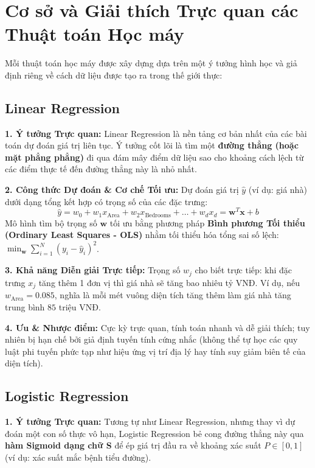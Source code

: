 \documentclass[12pt,a4paper]{report}
\begin{document}
\section{Cơ sở và Giải thích Trực quan các Thuật toán Học máy}

Mỗi thuật toán học máy được xây dựng dựa trên một ý tưởng hình học và giả định riêng về cách dữ liệu được tạo ra trong thế giới thực:

\subsection{Linear Regression}
\textbf{1. Ý tưởng Trực quan:} Linear Regression là nền tảng cơ bản nhất của các bài toán dự đoán giá trị liên tục. Ý tưởng cốt lõi là tìm một \textbf{đường thẳng (hoặc mặt phẳng phẳng)} đi qua đám mây điểm dữ liệu sao cho khoảng cách lệch từ các điểm thực tế đến đường thẳng này là nhỏ nhất.

\textbf{2. Công thức Dự đoán \& Cơ chế Tối ưu:}
Dự đoán giá trị $\hat{y}$ (ví dụ: giá nhà) dưới dạng tổng kết hợp có trọng số của các đặc trưng:
\begin{equation}
\hat{y} = w_0 + w_1 x_{\text{Area}} + w_2 x_{\text{Bedrooms}} + \dots + w_d x_d = \mathbf{w}^T \mathbf{x} + b
\end{equation}
Mô hình tìm bộ trọng số $\mathbf{w}$ tối ưu bằng phương pháp \textbf{Bình phương Tối thiểu (Ordinary Least Squares - OLS)} nhằm tối thiểu hóa tổng sai số lệch: $\min_{\mathbf{w}} \sum_{i=1}^N (y_i - \hat{y}_i)^2$.

\textbf{3. Khả năng Diễn giải Trực tiếp:} Trọng số $w_j$ cho biết trực tiếp: khi đặc trưng $x_j$ tăng thêm 1 đơn vị thì giá nhà sẽ tăng bao nhiêu tỷ VNĐ. Ví dụ, nếu $w_{\text{Area}} = 0.085$, nghĩa là mỗi mét vuông diện tích tăng thêm làm giá nhà tăng trung bình $85$ triệu VNĐ.

\textbf{4. Ưu \& Nhược điểm:} Cực kỳ trực quan, tính toán nhanh và dễ giải thích; tuy nhiên bị hạn chế bởi giả định tuyến tính cứng nhắc (không thể tự học các quy luật phi tuyến phức tạp như hiệu ứng vị trí địa lý hay tính suy giảm biên tế của diện tích).

\subsection{Logistic Regression}
\textbf{1. Ý tưởng Trực quan:} Tương tự như Linear Regression, nhưng thay vì dự đoán một con số thực vô hạn, Logistic Regression bẻ cong đường thẳng này qua \textbf{hàm Sigmoid dạng chữ S} để ép giá trị đầu ra về khoảng xác suất $P \in [0, 1]$ (ví dụ: xác suất mắc bệnh tiểu đường).
\end{document}
